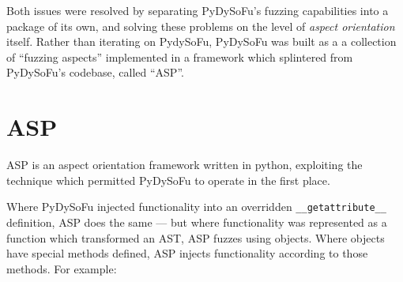 \documentclass[draft]{article}
\begin{document}
Both issues were resolved by separating PyDySoFu's fuzzing capabilities into a
package of its own, and solving these problems on the level of \emph{aspect
  orientation} itself. Rather than iterating on PydySoFu, PyDySoFu was built as
a a collection of ``fuzzing aspects'' implemented in a framework which
splintered from PyDySoFu's codebase, called ``ASP''.\par


\section{ASP}
ASP\cite{asp_repo} is an aspect orientation framework written in python,
exploiting the technique which permitted PyDySoFu to operate in the first
place.\par

Where PyDySoFu injected functionality into an overridden
\texttt{\_\_getattribute\_\_} definition, ASP does the same --- but where
functionality was represented as a function which transformed an AST, ASP fuzzes
using objects. Where objects have special methods defined, ASP injects
functionality according to those methods. For example:
\end{document}
